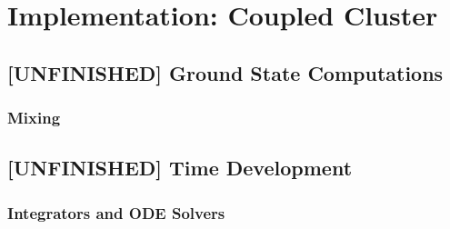 \chapter{Implementation: Coupled Cluster}

\section{[UNFINISHED] Ground State Computations}

    

    

    

    

\subsection{Mixing}

\section{[UNFINISHED] Time Development}

\subsection{Integrators and ODE Solvers}